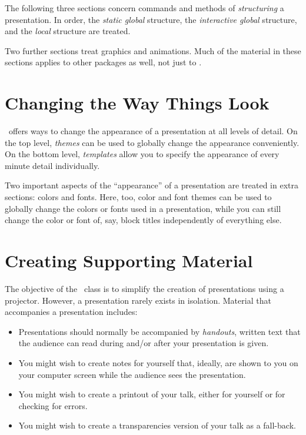 \documentclass{ltxdoc}
\begin{document}
The following three sections concern commands and methods of \emph{structuring} a presentation. In order, the \emph{static global} structure, the \emph{interactive global} structure, and the \emph{local} structure are treated.

Two further sections treat graphics and animations. Much of the material in these sections applies to other packages as well, not just to \beamer.











\part{Changing the Way Things Look}

\beamer\ offers ways to change the appearance of a presentation at all levels of detail. On the top level, \emph{themes} can be used to globally change the appearance conveniently. On the bottom level, \emph{templates} allow you to specify the appearance of every minute detail individually.

Two important aspects of the ``appearance'' of a presentation are treated in extra sections: colors and fonts. Here, too, color and font themes can be used to globally change the colors or fonts used in a presentation, while you can still change the color or font of, say, block titles independently of everything else.








\part{Creating Supporting Material}

The objective of the \beamer\ class is to simplify the creation of presentations using a projector. However, a presentation rarely exists in isolation. Material that accompanies a presentation includes:
\begin{itemize}
\item
  Presentations should normally be accompanied by \emph{handouts}, written text that the audience can read during and/or after your presentation is given.
\item
  You might wish to create notes for yourself that, ideally, are shown to you on your computer screen while the audience sees the presentation.
\item
  You might wish to create a printout of your talk, either for yourself or for checking for errors.
\item
  You might wish to create a transparencies version of your talk as a fall-back.
\end{itemize}
\end{document}
